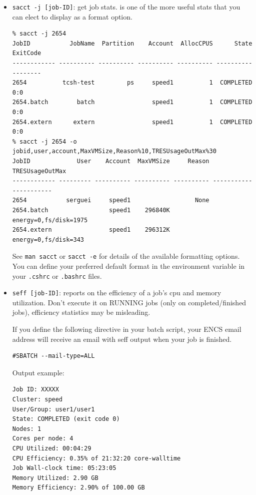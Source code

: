 \begin{itemize}
\item
\texttt{sacct -j [job-ID]}: get job stats.
 is one of the more useful stats that you can elect to display
as a format option.

\small
\begin{verbatim}
% sacct -j 2654
JobID           JobName  Partition    Account  AllocCPUS      State ExitCode
------------ ---------- ---------- ---------- ---------- ---------- --------
2654          tcsh-test         ps     speed1          1  COMPLETED      0:0
2654.batch        batch                speed1          1  COMPLETED      0:0
2654.extern      extern                speed1          1  COMPLETED      0:0
% sacct -j 2654 -o jobid,user,account,MaxVMSize,Reason%10,TRESUsageOutMax%30
JobID             User    Account  MaxVMSize     Reason        TRESUsageOutMax
------------ --------- ---------- ---------- ---------- ----------------------
2654           serguei     speed1                  None
2654.batch                 speed1    296840K             energy=0,fs/disk=1975
2654.extern                speed1    296312K              energy=0,fs/disk=343
\end{verbatim}
\normalsize

See \texttt{man sacct} or \texttt{sacct -e} for details of the
available formatting options. You can define your preferred
default format in the  environment variable
in your \texttt{.cshrc} or \texttt{.bashrc} files.

\item
\texttt{seff [job-ID]}: reports on the efficiency of a job's cpu and memory utilization. 
Don't execute it on RUNNING jobs (only on completed/finished jobs), efficiency statistics may be misleading.

If you define the following directive in your batch script, your ENCS email address will receive an email with seff output when your job is finished.
\small
\begin{verbatim}
#SBATCH --mail-type=ALL        
\end{verbatim}
\normalsize

Output example:
\small
\begin{verbatim}
Job ID: XXXXX
Cluster: speed
User/Group: user1/user1
State: COMPLETED (exit code 0)
Nodes: 1
Cores per node: 4
CPU Utilized: 00:04:29
CPU Efficiency: 0.35% of 21:32:20 core-walltime
Job Wall-clock time: 05:23:05
Memory Utilized: 2.90 GB
Memory Efficiency: 2.90% of 100.00 GB
\end{verbatim}
\normalsize


\end{itemize}


